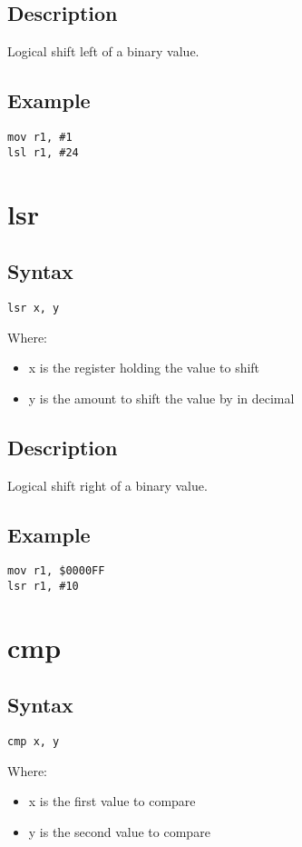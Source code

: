 \documentclass[11pt]{scrartcl}
\begin{document}
\subsection{Description}
Logical shift left of a binary value.
\subsection{Example}
\begin{verbatim}
mov r1, #1
lsl r1, #24
\end{verbatim}

\section{lsr}
\subsection{Syntax}
\begin{verbatim}
lsr x, y
\end{verbatim}
Where:
\begin{itemize}
    \item x is the register holding the value to shift
    \item y is the amount to shift the value by in decimal
\end{itemize}
\subsection{Description}
Logical shift right of a binary value.
\subsection{Example}
\begin{verbatim}
mov r1, $0000FF
lsr r1, #10
\end{verbatim}

\section{cmp}
\subsection{Syntax}
\begin{verbatim}
cmp x, y
\end{verbatim}
Where:
\begin{itemize}
    \item x is the first value to compare
    \item y is the second value to compare
\end{itemize}
\end{document}
